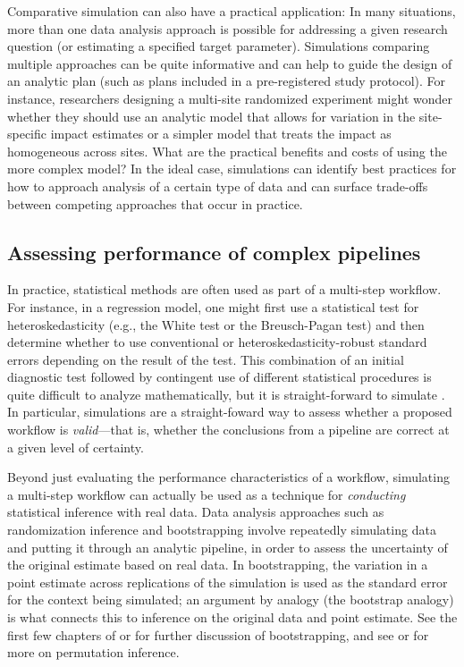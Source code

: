 \documentclass[
]{book}
\begin{document}
Comparative simulation can also have a practical application: In many situations, more than one data analysis approach is possible for addressing a given research question (or estimating a specified target parameter).
Simulations comparing multiple approaches can be quite informative and can help to guide the design of an analytic plan (such as plans included in a pre-registered study protocol).
For instance, researchers designing a multi-site randomized experiment might wonder whether they should use an analytic model that allows for variation in the site-specific impact estimates \citep{miratrix2021applied} or a simpler model that treats the impact as homogeneous across sites.
What are the practical benefits and costs of using the more complex model?
In the ideal case, simulations can identify best practices for how to approach analysis of a certain type of data and can surface trade-offs between competing approaches that occur in practice.

\subsection{Assessing performance of complex pipelines}\label{assessing-performance-of-complex-pipelines}

In practice, statistical methods are often used as part of a multi-step workflow.
For instance, in a regression model, one might first use a statistical test for heteroskedasticity (e.g., the White test or the Breusch-Pagan test) and then determine whether to use conventional or heteroskedasticity-robust standard errors depending on the result of the test.
This combination of an initial diagnostic test followed by contingent use of different statistical procedures is quite difficult to analyze mathematically, but it is straight-forward to simulate \citep[see, for example,][]{longUsingHeteroscedasticityConsistent2000}.
In particular, simulations are a straight-foward way to assess whether a proposed workflow is \emph{valid}---that is, whether the conclusions from a pipeline are correct at a given level of certainty.

Beyond just evaluating the performance characteristics of a workflow, simulating a multi-step workflow can actually be used as a technique for \emph{conducting} statistical inference with real data.
Data analysis approaches such as randomization inference and bootstrapping involve repeatedly simulating data and putting it through an analytic pipeline, in order to assess the uncertainty of the original estimate based on real data.
In bootstrapping, the variation in a point estimate across replications of the simulation is used as the standard error for the context being simulated;
an argument by analogy (the bootstrap analogy) is what connects this to inference on the original data and point estimate.
See the first few chapters of \citet{davison1997BootstrapMethodsTheir} or \citet{efron2000BootstrapModernStatistics} for further discussion of bootstrapping, and see \citet{good2013permutation} or \citet{lehmann1975statistical} for more on permutation inference.
\end{document}
